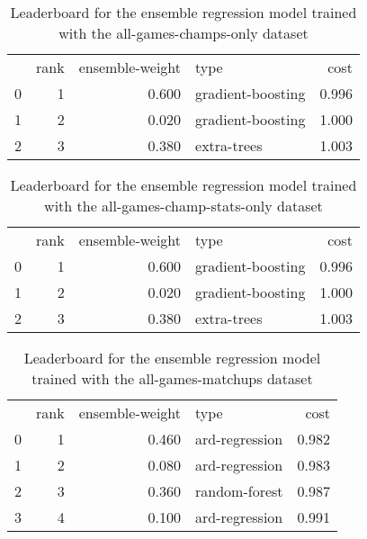 \begin{table}[]
	\centering
	\begin{tabular}{lrrlr}
		  & rank & ensemble-weight & type              & cost  \\
		0 & 1    & 0.600           & gradient-boosting & 0.996 \\
		1 & 2    & 0.020           & gradient-boosting & 1.000 \\
		2 & 3    & 0.380           & extra-trees       & 1.003 \\
	\end{tabular}

	\caption{Leaderboard for the ensemble regression model trained with the all-games-champs-only dataset}
	\label{tab:lb-reg-all-games-champs-only}
\end{table}

\begin{table}[]
	\centering
	\begin{tabular}{lrrlr}
		  & rank & ensemble-weight & type              & cost  \\
		0 & 1    & 0.600           & gradient-boosting & 0.996 \\
		1 & 2    & 0.020           & gradient-boosting & 1.000 \\
		2 & 3    & 0.380           & extra-trees       & 1.003 \\
	\end{tabular}

	\caption{Leaderboard for the ensemble regression model trained with the all-games-champ-stats-only dataset}
	\label{tab:lb-reg-all-games-champ-stats-only}
\end{table}

\begin{table}[]
	\centering
	\begin{tabular}{lrrlr}
		  & rank & ensemble-weight & type           & cost  \\
		0 & 1    & 0.460           & ard-regression & 0.982 \\
		1 & 2    & 0.080           & ard-regression & 0.983 \\
		2 & 3    & 0.360           & random-forest  & 0.987 \\
		3 & 4    & 0.100           & ard-regression & 0.991 \\
	\end{tabular}

	\caption{Leaderboard for the ensemble regression model trained with the all-games-matchups dataset}
	\label{tab:lb-reg-all-games-matchups}
\end{table}

